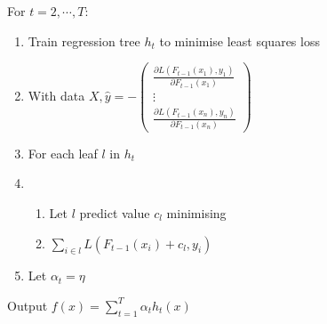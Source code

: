 \documentclass{article}
\begin{document}
  
\newpage
  For $t = 2, \cdots, T$:
  \begin{enumerate}
    \item Train regression tree $h_t$ to minimise least squares loss
    \item With data $X, \hat{y} = -\begin{pmatrix}
      \frac{\partial L (F_{t-1}(x_1), y_1)}{\partial F_{t-1}(x_1)} \\
      \vdots \\
      \frac{\partial L (F_{t-1}(x_n), y_n)}{\partial F_{t-1}(x_n)}
    \end{pmatrix} $
    \item For each leaf $l$ in $h_t$
    \item \begin{enumerate}
      \item Let $l$ predict value $c_l$ minimising
      \item $\sum_{i \in l}{L(F_{t-1}(x_i)+c_l, y_i)}$
    \end{enumerate}
    \item Let $\alpha_t = \eta$
  \end{enumerate}
  Output $f(x) = \sum_{t=1}^{T}{\alpha_t h_t(x)}$
\end{document}
